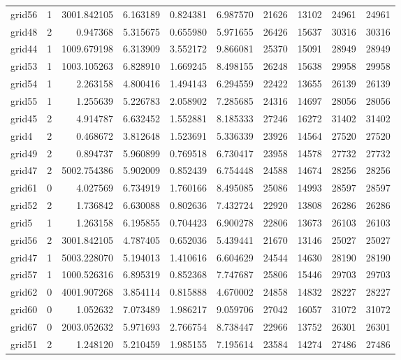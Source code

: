 \begin{longtable}{|l|r|r|r|r|r|r|r|r|r|}
grid56 & 1 & 3001.842105 & 6.163189 & 0.824381 & 6.987570 & 21626 & 13102 & 24961 & 24961 \\
grid48 & 2 & 0.947368 & 5.315675 & 0.655980 & 5.971655 & 26426 & 15637 & 30316 & 30316 \\
grid44 & 1 & 1009.679198 & 6.313909 & 3.552172 & 9.866081 & 25370 & 15091 & 28949 & 28949 \\
grid53 & 1 & 1003.105263 & 6.828910 & 1.669245 & 8.498155 & 26248 & 15638 & 29958 & 29958 \\
grid54 & 1 & 2.263158 & 4.800416 & 1.494143 & 6.294559 & 22422 & 13655 & 26139 & 26139 \\
grid55 & 1 & 1.255639 & 5.226783 & 2.058902 & 7.285685 & 24316 & 14697 & 28056 & 28056 \\
grid45 & 2 & 4.914787 & 6.632452 & 1.552881 & 8.185333 & 27246 & 16272 & 31402 & 31402 \\
grid4 & 2 & 0.468672 & 3.812648 & 1.523691 & 5.336339 & 23926 & 14564 & 27520 & 27520 \\
grid49 & 2 & 0.894737 & 5.960899 & 0.769518 & 6.730417 & 23958 & 14578 & 27732 & 27732 \\
grid47 & 2 & 5002.754386 & 5.902009 & 0.852439 & 6.754448 & 24588 & 14674 & 28256 & 28256 \\
grid61 & 0 & 4.027569 & 6.734919 & 1.760166 & 8.495085 & 25086 & 14993 & 28597 & 28597 \\
grid52 & 2 & 1.736842 & 6.630088 & 0.802636 & 7.432724 & 22920 & 13808 & 26286 & 26286 \\
grid5 & 1 & 1.263158 & 6.195855 & 0.704423 & 6.900278 & 22806 & 13673 & 26103 & 26103 \\
grid56 & 2 & 3001.842105 & 4.787405 & 0.652036 & 5.439441 & 21670 & 13146 & 25027 & 25027 \\
grid47 & 1 & 5003.228070 & 5.194013 & 1.410616 & 6.604629 & 24544 & 14630 & 28190 & 28190 \\
grid57 & 1 & 1000.526316 & 6.895319 & 0.852368 & 7.747687 & 25806 & 15446 & 29703 & 29703 \\
grid62 & 0 & 4001.907268 & 3.854114 & 0.815888 & 4.670002 & 24858 & 14832 & 28227 & 28227 \\
grid60 & 0 & 1.052632 & 7.073489 & 1.986217 & 9.059706 & 27042 & 16057 & 31072 & 31072 \\
grid67 & 0 & 2003.052632 & 5.971693 & 2.766754 & 8.738447 & 22966 & 13752 & 26301 & 26301 \\
grid51 & 2 & 1.248120 & 5.210459 & 1.985155 & 7.195614 & 23584 & 14274 & 27486 & 27486 \\

\end{longtable}
